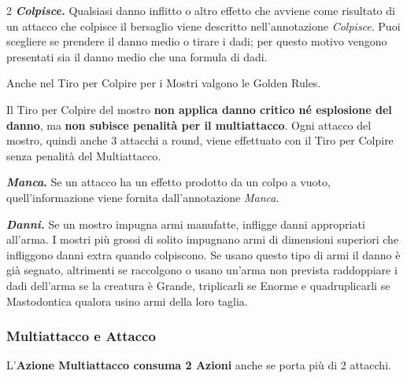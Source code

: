 \begin{multicols}{2}
\emph{\textbf{Colpisce.}} Qualsiasi danno inflitto o altro effetto che avviene come risultato di un attacco che colpisce il bersaglio viene descritto nell'annotazione \emph{Colpisce}. Puoi scegliere se prendere il danno medio o tirare i dadi; per questo motivo vengono presentati sia il danno medio che una formula di dadi.

Anche nel Tiro per Colpire per i Mostri valgono le Golden Rules.

Il Tiro per Colpire del mostro \textbf{non applica danno critico né esplosione del danno}, ma \textbf{non subisce penalità per il multiattacco}. Ogni attacco del mostro, quindi anche 3 attacchi a round, viene effettuato con il Tiro per Colpire senza penalità del Multiattacco.

\textbf{\emph{Manca}.} Se un attacco ha un effetto prodotto da un colpo a vuoto, quell'informazione viene fornita dall'annotazione \emph{Manca}.

\emph{\textbf{Danni.}} Se un mostro impugna armi manufatte, infligge danni appropriati all'arma. I mostri più grossi di solito impugnano armi di dimensioni superiori che infliggono danni extra quando colpiscono. Se usano questo tipo di armi il danno è già segnato, altrimenti se raccolgono o usano un'arma non prevista raddoppiare i dadi dell'arma se la creatura è Grande, triplicarli se Enorme e quadruplicarli se Mastodontica qualora usino armi della loro taglia.




\subsubsection{Multiattacco e Attacco}

L'\textbf{Azione Multiattacco consuma 2 Azioni} anche se porta più di 2 attacchi.


\end{multicols}

